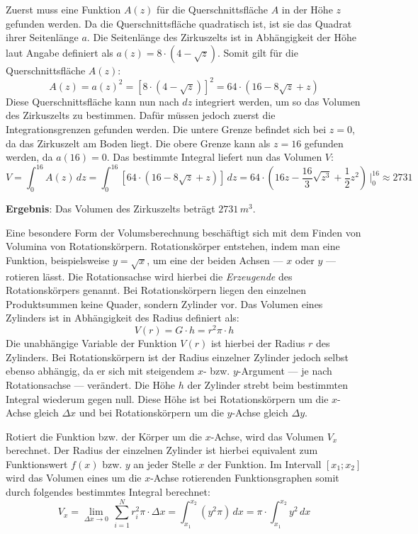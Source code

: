Zuerst muss eine Funktion $A(z)$ f\"{u}r die Querschnittsfl\"{a}che $A$ in der H\"{o}he $z$ gefunden werden. Da die Querschnittsfl\"{a}che quadratisch ist, ist sie das Quadrat ihrer Seitenl\"{a}nge $a$. Die Seitenl\"{a}nge des Zirkuszelts ist in Abh\"{a}ngigkeit der H\"{o}he laut Angabe definiert als $a(z) = 8 \cdot (4 - \sqrt{z})$. Somit gilt f\"{u}r die Querschnittsfl\"{a}che $A(z)$: $$A(z) = a(z)^2 = \left[ 8 \cdot (4 - \sqrt{z}) \right]^2 = 64 \cdot (16 -8\sqrt{z} + z)$$ Diese Querschnittsfl\"{a}che kann nun nach $dz$ integriert werden, um so das Volumen des Zirkuszelts zu bestimmen. Daf\"{u}r m\"{u}ssen jedoch zuerst die Integrationsgrenzen gefunden werden. Die untere Grenze befindet sich bei $z = 0$, da das Zirkuszelt am Boden liegt. Die obere Grenze kann als $z = 16$ gefunden werden, da $a(16) = 0$. Das bestimmte Integral liefert nun das Volumen $V$: $$V = \int_{0}^{16} A(z) \, dz = \int_{0}^{16} \left[ 64 \cdot (16 -8\sqrt{z} + z) \right] \, dz = 64 \cdot \left( 16z -\frac{16}{3}\sqrt{z^3} + \frac{1}{2}z^2 \right) \, \bigg|_{0}^{16} \approx 2731$$

\textbf{Ergebnis}: Das Volumen des Zirkuszelts betr\"{a}gt $2731 \, m^3$.


Eine besondere Form der Volumsberechnung besch\"{a}ftigt sich mit dem Finden von Volumina von Rotationsk\"{o}rpern. Rotationsk\"{o}rper entstehen, indem man eine Funktion, beispielsweise $y = \sqrt{x}$, um eine der beiden Achsen --- $x$ oder $y$ --- rotieren l\"{a}sst. Die Rotationsachse wird hierbei die \emph{Erzeugende} des Rotationsk\"{o}rpers genannt. Bei Rotationsk\"{o}rpern liegen den einzelnen Produktsummen keine Quader, sondern Zylinder vor. Das Volumen eines Zylinders ist in Abh\"{a}ngigkeit des Radius definiert als: $$V(r) = G \cdot h = r^2 \pi \cdot h$$ Die unabh\"{a}ngige Variable der Funktion $V(r)$ ist hierbei der Radius $r$ des Zylinders. Bei Rotationsk\"{o}rpern ist der Radius einzelner Zylinder jedoch selbst ebenso abh\"{a}ngig, da er sich mit steigendem $x$- bzw. $y$-Argument --- je nach Rotationsachse --- ver\"{a}ndert. Die H\"{o}he $h$ der Zylinder strebt beim bestimmten Integral wiederum gegen null. Diese H\"{o}he ist bei Rotationsk\"{o}rpern um die $x$-Achse gleich $\Delta x$ und bei Rotationsk\"{o}rpern um die $y$-Achse gleich $\Delta y$.

Rotiert die Funktion bzw. der K\"{o}rper um die $x$-Achse, wird das Volumen $V_x$ berechnet. Der Radius der einzelnen Zylinder ist hierbei equivalent zum Funktionswert $f(x)$ bzw. $y$ an jeder Stelle $x$ der Funktion. Im Intervall $[x_1 ; x_2 ]$ wird das Volumen eines um die $x$-Achse rotierenden Funktionsgraphen somit durch folgendes bestimmtes Integral berechnet: $$V_x = \lim_{\Delta x \rightarrow 0} \, \sum_{i=1}^{N} r_i^2 \pi \cdot \Delta x = \int_{x_1}^{x_2} (y^2 \pi) \, dx = \pi \cdot \int_{x_1}^{x_2} y^2 \, dx$$ 

